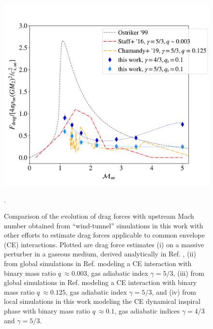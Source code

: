 \begin{figure}
 \centering
 \includegraphics[width=13cm]{figures/common_envelope/Cd_ostriker_staff_chamandy_compare_ostriker_fig3units.pdf}\caption{Comparison of the evolution of drag forces with upstream Mach number obtained from ``wind-tunnel'' simulations in this work with other efforts to estimate drag forces applicable to common envelope (CE) interactions. Plotted are drag force estimates (i) on a massive perturber in a gaseous medium, derived analytically in Ref. \cite{1999ApJ...513..252O}, (ii) from global simulations in Ref. \cite{Staff:2016} modeling a CE interaction with binary mass ratio $q~\approx 0.003$, gas adiabatic index $\gamma = 5/3$, (iii) from global simulations in Ref. \cite{Chamandy:2019psk} modeling a CE interaction with binary mass ratio $q~\approx 0.125$, gas adiabatic index $\gamma = 5/3$, and (iv) from local simulations in this work modeling the CE dynamical inspiral phase with binary mass ratio $q~\approx 0.1$, gas adiabatic indices $\gamma = 4/3$ and $\gamma = 5/3$. \label{fig:drag_compare}}.
\end{figure}
